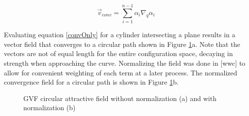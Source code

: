 \documentclass[numbered,pdftex]{ohio-etd}
\begin{document}
\begin{equation}
\vec{v}_{conv} = \sum_{i=1}^{n-1}\alpha_i\nabla_q\alpha_i  
\label{convOnly}
\end{equation}


Evaluating equation \ref{convOnly} for a cylinder intersecting a plane results in a vector field that converges to a circular path shown in Figure \ref{fig:gvfCircAttractive}a. Note that the vectors are not of equal length for the entire configuration space, decaying in strength when approaching the curve. Normalizing the field was done in [wwc] \cite{goncalves_circulation_2010,goncalves_vector_2010} to allow for convenient weighting of each term at a later process. The normalized convergence field for a circular path is shown in Figure \ref{fig:gvfCircAttractive}b. 

\begin{figure}[H]
	\begin{subfigmatrix}{2}%
		\centering	
		\hspace*{0mm}
	\end{subfigmatrix}
	\caption{GVF circular attractive field without normalization (a) and with normalization (b)}
	\label{fig:gvfCircAttractive}
\end{figure}
\end{document}
